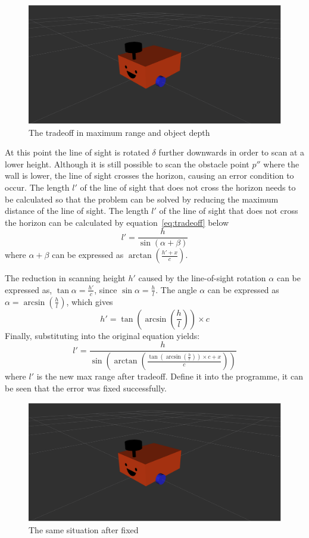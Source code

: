 \begin{figure}[H]
    \centering
    \includegraphics[width=0.8\linewidth]{figs/robot.png}
    \caption{The tradeoff in maximum range and object depth}
    \label{fig:tradeoff2}
\end{figure}

At this point the line of sight is rotated $\delta$ further downwards in order to scan at a lower height. Although it is still possible to scan the obstacle point $p''$ where the wall is lower, the line of sight crosses the horizon, causing an error condition to occur. The length $l'$ of the line of sight that does not cross the horizon needs to be calculated so that the problem can be solved by reducing the maximum distance of the line of sight. 
The length $l'$ of the line of sight that does not cross the horizon can be calculated by equation~\ref{eq:tradeoff} below 
\begin{equation}
    l'=\frac{h}{\sin{(\alpha+\beta)}}
    \label{eq:tradeoff}
\end{equation}
where $\alpha+\beta$ can be expressed as $\arctan(\frac{h'+x}{c})$. 

The reduction in scanning height $h'$ caused by the line-of-sight rotation $\alpha$ can be expressed as, $\tan\alpha=\frac{h'}{c}
$, since $\sin\alpha=\frac{h}{l}$. The angle $\alpha$ can be expressed as $\alpha=\arcsin(\frac{h}{l})$, which gives
\begin{equation}
    h'=\tan(\arcsin(\frac{h}{l}))\times c
\end{equation}
Finally, substituting into the original equation yields: 
\begin{equation}
    l'=\frac{h}{\sin{(\arctan(\frac{\tan(\arcsin(\frac{h}{l}))\times c+x}{c}))}}
\end{equation}
where $l'$ is the new max range after tradeoff. Define it into the programme, it can be seen that the error was fixed successfully.

\begin{figure}[H]
    \centering
    \includegraphics[width=0.8\linewidth]{figs/robot.png}
    \caption{The same situation after fixed}
\end{figure}

